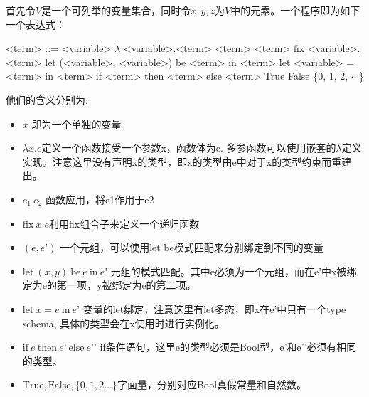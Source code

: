 \documentclass[12pt, titlepage]{article}
\begin{document}
	首先令$V$是一个可列举的变量集合，同时令$x, y, z$为$V$中的元素。一个程序即为如下一个表达式：
	\setlength{\grammarindent}{8em} %
    \begin{grammar}
        <term> ::= <variable>
        \vspace{0.3em}
        \alt $\lambda$ <variable>.<term>
        \vspace{0.3em}
        \alt <term> <term>
        \vspace{0.3em}
        \alt fix <variable>.<term>
        \vspace{0.3em}
        \alt let (<variable>, <variable>) be <term> in <term>
        \vspace{0.3em}
        \alt let <variable> = <term> in <term>
        \vspace{0.3em}
        \alt if <term> then <term> else <term>
        \vspace{0.3em}
        \alt True
        \vspace{0.3em}
        \alt False
        \vspace{0.3em}
        \alt\{0, 1, 2, $\cdots$\}
	\end{grammar}
	他们的含义分别为:
	\begin{itemize}
	  \setlength\itemsep{0.1em}
		\item $x$ 即为一个单独的变量
		\item $\lambda x.e$定义一个函数接受一个参数x，函数体为e. 多参函数可以使用嵌套的$\lambda$定义实现。注意这里没有声明x的类型，即x的类型由e中对于x的类型约束而重建出。
		\item $e_1\ e_2$ 函数应用，将e1作用于e2
		\item $\mathrm{fix}\ x.e$利用fix组合子来定义一个递归函数
		\item $(e, e’)$ 一个元组，可以使用let be模式匹配来分别绑定到不同的变量
		\item $\mathrm{let}\ (x, y)\ \mathrm{be}\ e\ \mathrm{in}\ e’$ 元组的模式匹配。其中e必须为一个元组，而在e’中x被绑定为e的第一项，y被绑定为e的第二项。
		\item $\mathrm{let}\ x = e\ \mathrm{in}\ e’$ 变量的let绑定，注意这里有let多态，即x在e’中只有一个type schema, 具体的类型会在x使用时进行实例化。
		\item $\mathrm{if}\ e\ \mathrm{then}\ e’\ \mathrm{else}\ e’’$ if条件语句，这里e的类型必须是Bool型，e’和e’’必须有相同的类型。
		\item $\mathrm{True}, \mathrm{False}, \{0, 1, 2…\}$字面量，分别对应Bool真假常量和自然数。
	\end{itemize}	
\end{document}
